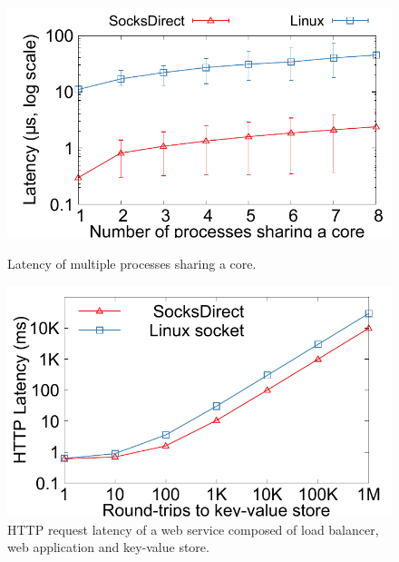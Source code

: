\begin{figure}[t!]
\begin{minipage}{.31\textwidth}
		\centering \includegraphics[width=\textwidth]{eval/microbenchmark/sharecore-lat.pdf}
		\vspace{-15pt}
		\label{fig:eval-context-switch}
		\caption{Latency of multiple processes sharing a core.}
	\end{minipage}
	\hspace{0.01\textwidth}
	\begin{minipage}{.31\textwidth}
		
		\centering \includegraphics[width=\textwidth]{eval/microbenchmark/nginx-multiround-tput.pdf}
		\vspace{-15pt}
		\caption{HTTP request latency of a web service composed of load balancer, web application and key-value store.}
		\label{fig:eval-nginx-multiround}
	\end{minipage}
\vspace{-10pt}
\end{figure}

